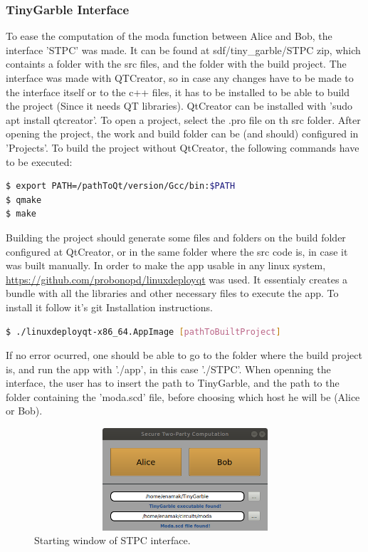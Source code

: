 \begin{refsection}
\newpage
\subsubsection{TinyGarble Interface}

To ease the computation of the moda function between Alice and Bob, the interface 'STPC' was made. It can be found at sdf/tiny\_garble/STPC zip, which containts a folder with the src files, and the folder with the build project. The interface was made with QTCreator, so in case any changes have to be made to the interface itself or to the c++ files, it has to be installed to be able to build the project (Since it needs QT libraries). QtCreator can be installed with 'sudo apt install qtcreator'. To open a project, select the .pro file on th src folder.
After opening the project, the work and build folder can be (and should) configured in 'Projects'.
To build the project without QtCreator, the following commands have to be executed:

\begin{lstlisting}[caption={Manually building QT application}, language=bash, captionpos=b]
$ export PATH=/pathToQt/version/Gcc/bin:$PATH
$ qmake
$ make
\end{lstlisting}

Building the project should generate some files and folders on the build folder configured at QtCreator, or in the same folder where the src code is, in case it was built manually. 
In order to make the app usable in any linux system, \url{https://github.com/probonopd/linuxdeployqt} was used. It essentialy creates a bundle with all the libraries and other necessary files to execute the app. To install it follow it's git Installation instructions. 

\begin{lstlisting}[caption={Deploying QT application}, language=bash, captionpos=b]
$ ./linuxdeployqt-x86_64.AppImage [pathToBuiltProject]
\end{lstlisting}

If no error ocurred, one should be able to go to the folder where the build project is, and run the app with './app', in this case './STPC'.
When openning the interface, the user has to insert the path to TinyGarble, and the path to the folder containing the 'moda.scd' file, before choosing which host he will be (Alice or Bob).

\begin{figure}[H]
	\centering
	\includegraphics[width=1\textwidth, height=3.8cm]{./sdf/tiny_garble/figures/STPC_start.png}
    \caption{Starting window of STPC interface.}\label{fig:STPC_start}
\end{figure}


\end{refsection}
